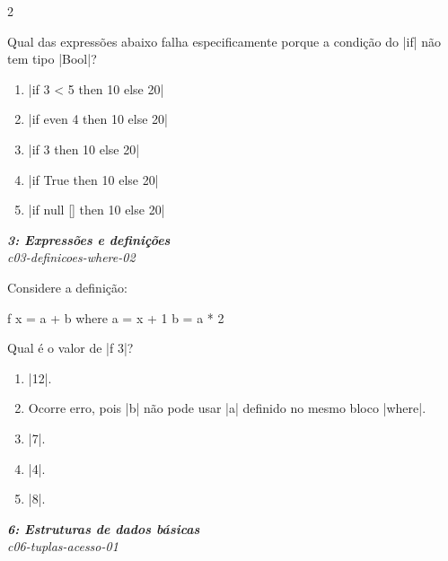 \documentclass[a4paper,10pt,brazil]{article}
\begin{document}
\begin{multicols}{2}
\begin{flushright}
\end{flushright}
Qual das expressões abaixo falha especificamente porque a condição do \haskellinline|if| não tem tipo \haskellinline|Bool|?

\begin{enumerate}
  \item \haskellinline|if 3 < 5 then 10 else 20|

  \item \haskellinline|if even 4 then 10 else 20|

  \item \haskellinline|if 3 then 10 else 20|

  \item \haskellinline|if True then 10 else 20|

  \item \haskellinline|if null [] then 10 else 20|


\end{enumerate}

\begin{flushright}
  \footnotesize
  \textit{\textbf{3: Expressões e definições}}\\
  \textit{c03-definicoes-where-02}\\

\end{flushright}
Considere a definição:

\begin{haskellcode}
f x = a + b
  where
    a = x + 1
    b = a * 2
\end{haskellcode}

Qual é o valor de \haskellinline|f 3|?

\begin{enumerate}
  \item \haskellinline|12|.

  \item Ocorre erro, pois \haskellinline|b| não pode usar \haskellinline|a| definido no mesmo bloco \haskellinline|where|.

  \item \haskellinline|7|.

  \item \haskellinline|4|.

  \item \haskellinline|8|.


\end{enumerate}

\begin{flushright}
  \footnotesize
  \textit{\textbf{6: Estruturas de dados básicas}}\\
  \textit{c06-tuplas-acesso-01}\\


\end{flushright}
\end{multicols}
\end{document}
